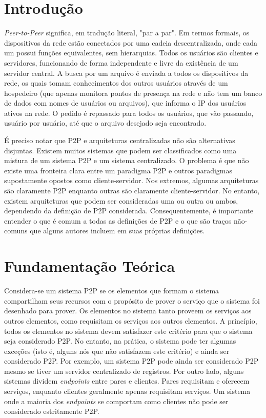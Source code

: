 \documentclass[a4paper]{article}
\begin{document}
\tableofcontents
\newpage
{}

\section{Introdução}
\textit{Peer-to-Peer} significa, em tradução literal, "par a par". Em termos formais, os dispositivos da rede estão conectados por uma cadeia descentralizada, onde cada um possui funções equivalentes, sem hierarquias. Todos os usuários são clientes e servidores, funcionando de forma independente e livre da existência de um servidor central. A busca por um arquivo é enviada a todos os dispositivos da rede, os quais tomam conhecimentos dos outros usuários através de um hospedeiro (que apenas monitora pontos de presença na rede e não tem um banco de dados com nomes de usuários ou arquivos), que informa o IP dos usuários ativos na rede. O pedido é repassado para todos os usuários, que vão passando, usuário por usuário, até que o arquivo desejado seja encontrado.\cite{sisp2p}

É preciso notar que P2P e arquiteturas centralizadas não são alternativas disjuntas. Existem muitos sistemas que podem ser classificados como uma mistura de um sistema P2P e um sistema centralizado. O problema é que não existe uma fronteira clara entre um paradigma P2P e outros paradigmas supostamente opostos como cliente-servidor. Nos extremos, algumas arquiteturas são claramente P2P enquanto outras são claramente cliente-servidor. No entanto, existem arquiteturas que podem ser consideradas uma ou outra ou ambos, dependendo da definição de P2P considerada. Consequentemente, é importante entender o que é comum a todas as definições de P2P e o que são traços não-comuns que alguns autores incluem em suas próprias definições.\cite{camarillop2parch}

\section{Fundamentação Teórica}
Considera-se um sistema P2P se os elementos que formam o sistema compartilham seus recursos com o propósito de prover o serviço que o sistema foi desenhado para prover. Os elementos no sistema tanto proveem os serviços aos outros elementos, como requisitam os serviços aos outros elementos. A princípio, todos os elementos no sistema devem satisfazer este critério para que o sistema seja considerado P2P. No entanto, na prática, o sistema pode ter algumas exceções (isto é, alguns nós que não satisfazem este critério) e ainda ser considerado P2P. Por exemplo, um sistema P2P pode ainda ser considerado P2P mesmo se tiver um servidor centralizado de registros. Por outro lado, alguns sistemas dividem \textit{endpoints} entre pares e clientes. Pares requisitam e oferecem serviços, enquanto clientes geralmente apenas requisitam serviços. Um sistema onde a maioria dos \textit{endpoints} se comportam como clientes não pode ser considerado estritamente P2P. \cite{camarillop2parch}
\end{document}

